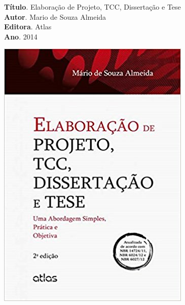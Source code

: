 \noindent \begin{minipage}{0.8\textwidth}
\textbf{Título}. Elaboração de Projeto, TCC, Dissertação e Tese \\
\textbf{Autor}. Mario de Souza Almeida\\
\textbf{Editora}. Atlas\\
\textbf{Ano}. 2014\\
\end{minipage}\begin{minipage}{0.2\textwidth}
\includegraphics[width=\linewidth]{./img/almeida}
\end{minipage}
